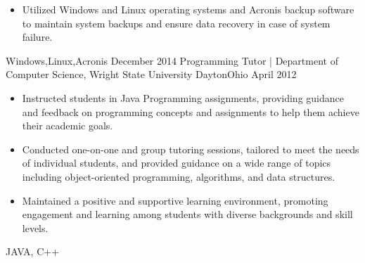 \begin{experiences}
{\begin{itemize}
          \item Utilized Windows and Linux operating systems and Acronis backup software to maintain system backups and ensure data recovery in case of system failure.
      \end{itemize}
  }
  {Windows,Linux,Acronis}
  \emptySeparator
  \experience
    {December 2014}     { Programming Tutor | Department of Computer Science, Wright State University }{Dayton}{Ohio}
    {April 2012}    {
      \begin{itemize}
        \item Instructed students in Java Programming assignments, providing guidance and feedback on programming concepts and assignments to help them achieve their academic goals.
        \item Conducted one-on-one and group tutoring sessions, tailored to meet the needs of individual students, and provided guidance on a wide range of topics including object-oriented programming, algorithms, and data structures.
        \item Maintained a positive and supportive learning environment, promoting engagement and learning among students with diverse backgrounds and skill levels.
      \end{itemize}
    }
    {JAVA, C++}
  \emptySeparator

\end{experiences}
